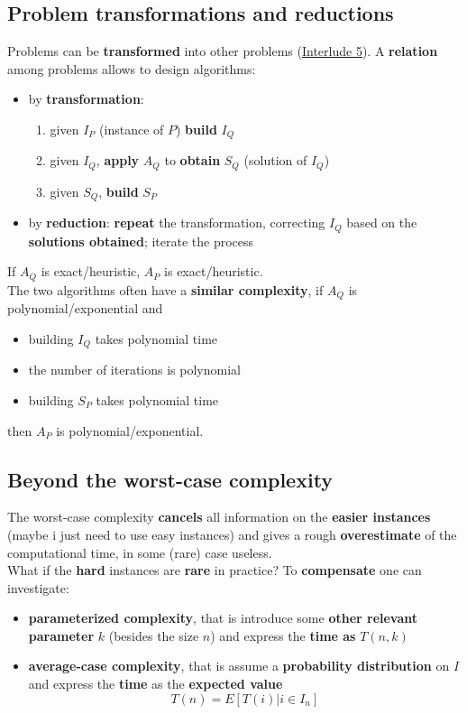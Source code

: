 \documentclass[11pt]{article}
\begin{document}
	\subsection{Problem transformations and reductions}
	Problems can be \textbf{transformed} into other problems (\hyperref[I5]{Interlude 5}). A \textbf{relation} among problems allows to design algorithms: 
	\begin{itemize}
		\item by \textbf{transformation}: 
		\begin{enumerate}
			\item given $I_P$ (instance of $P$) \textbf{build} $I_Q$
			\item given $I_Q$, \textbf{apply} $A_Q$ to \textbf{obtain} $S_Q$ (solution of $I_Q$)
			\item given $S_Q$, \textbf{build} $S_P$
		\end{enumerate}
		\item by \textbf{reduction}: \textbf{repeat} the transformation, correcting $I_Q$ based on the \textbf{solutions obtained}; iterate the process
	\end{itemize}
	
	If $A_Q$ is exact/heuristic, $A_P$ is exact/heuristic.\\
	
	The two algorithms often have a \textbf{similar complexity}, if $A_Q$ is polynomial/exponential and
	\begin{itemize}
		\item building $I_Q$ takes polynomial time
		\item the number of iterations is polynomial
		\item building $S_P$ takes polynomial time
	\end{itemize}
	then $A_P$ is polynomial/exponential.\\
	
	\newpage
	
	\subsection{Beyond the worst-case complexity}
	The worst-case complexity \textbf{cancels} all information on the \textbf{easier instances} (maybe i just need to use easy instances) and gives a rough \textbf{overestimate} of the computational time, in some (rare) case useless.\\
	
	What if the \textbf{hard} instances are \textbf{rare} in practice? To \textbf{compensate} one can investigate: 
	\begin{itemize}
		\item \textbf{parameterized complexity}, that is introduce some \textbf{other relevant parameter} $k$ (besides the size $n$) and express the \textbf{time as} $T(n,k)$
		\item \textbf{average-case complexity}, that is assume a \textbf{probability distribution} on $I$ and express the \textbf{time} as the \textbf{expected value}
		$$ T(n) = E \left[T(i) | i \in I_n \right] $$
	\end{itemize}
	
\end{document}
